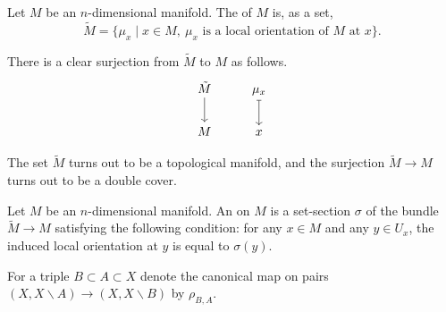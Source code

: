 \documentclass[main.tex]{subfiles}
\begin{document}
\begin{definition}
  \label{def:orientation_cover}
  Let \(M\) be an \(n\)-dimensional manifold. The  of \(M\) is, as a set,
  \begin{equation*}
    \tilde{M} = \{\mu_{x} \mid x \in M,\ \mu_{x} \text{ is a local orientation of }M \text{ at }x\}.
  \end{equation*}
\end{definition}

There is a clear surjection from \(\tilde{M}\) to \(M\) as follows.
\begin{equation*}
  \begin{tikzcd}
    \tilde{M}
    \arrow[d]
    & \mu_{x}
    \arrow[d, mapsto]
    \\
    M
    & x
  \end{tikzcd}
\end{equation*}

The set \(\tilde{M}\) turns out to be a topological manifold, and the surjection \(\tilde{M} \to M\) turns out to be a double cover.

\begin{definition}[orientation]
  \label{def:orientation}
  Let \(M\) be an \(n\)-dimensional manifold. An  on \(M\) is a set-section \(\sigma\) of the bundle \(\tilde{M} \to M\) satisfying the following condition: for any \(x \in M\) and any \(y \in U_{x}\), the induced local orientation at \(y\) is equal to \(\sigma(y)\).
\end{definition}

For a triple \(B \subset A \subset X\) denote the canonical map on pairs \((X, X\smallsetminus A) \to (X, X\smallsetminus B)\) by \(\rho_{B, A}\).
\end{document}
